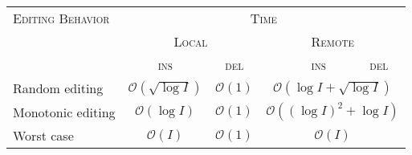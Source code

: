 
\begin{tabularx}{0.7\textwidth}{@{}Xcccc@{}}
  \toprule
  \textsc{Editing Behavior} & \multicolumn{4}{c}{\textsc{Time}} \\
    & \multicolumn{2}{c}{\textsc{Local}} & \multicolumn{2}{c}{\textsc{Remote}} \\ \cmidrule(r){2-3} \cmidrule(l){4-5}
  & \textsc{ins} & \textsc{del} & \ \ \ \ \textsc{ins} & \textsc{del}  \\ \midrule
  Random editing & $\mathcal{O}(\sqrt{\log I})$ & $\mathcal{O}(1)$ & \multicolumn{2}{c}{$\mathcal{O}(\log I + \sqrt{\log I})$} \\
  Monotonic editing & $\mathcal{O}(\log I)$ & $\mathcal{O}(1)$ & \multicolumn{2}{c}{$\mathcal{O}((\log I)^2 +\log I)$} \\
  Worst case & $\mathcal{O}(I)$ & $\mathcal{O}(1)$ & \multicolumn{2}{c}{$\mathcal{O}(I)$} \\ \bottomrule
\end{tabularx}


